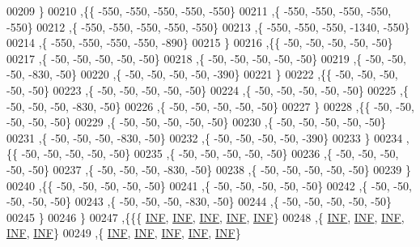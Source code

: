 \begin{DoxyCode}
00209   \}
00210  ,\{\{  -550,  -550,  -550,  -550,  -550\}
00211   ,\{  -550,  -550,  -550,  -550,  -550\}
00212   ,\{  -550,  -550,  -550,  -550,  -550\}
00213   ,\{  -550,  -550,  -550, -1340,  -550\}
00214   ,\{  -550,  -550,  -550,  -550,  -890\}
00215   \}
00216  ,\{\{   -50,   -50,   -50,   -50,   -50\}
00217   ,\{   -50,   -50,   -50,   -50,   -50\}
00218   ,\{   -50,   -50,   -50,   -50,   -50\}
00219   ,\{   -50,   -50,   -50,  -830,   -50\}
00220   ,\{   -50,   -50,   -50,   -50,  -390\}
00221   \}
00222  ,\{\{   -50,   -50,   -50,   -50,   -50\}
00223   ,\{   -50,   -50,   -50,   -50,   -50\}
00224   ,\{   -50,   -50,   -50,   -50,   -50\}
00225   ,\{   -50,   -50,   -50,  -830,   -50\}
00226   ,\{   -50,   -50,   -50,   -50,   -50\}
00227   \}
00228  ,\{\{   -50,   -50,   -50,   -50,   -50\}
00229   ,\{   -50,   -50,   -50,   -50,   -50\}
00230   ,\{   -50,   -50,   -50,   -50,   -50\}
00231   ,\{   -50,   -50,   -50,  -830,   -50\}
00232   ,\{   -50,   -50,   -50,   -50,  -390\}
00233   \}
00234  ,\{\{   -50,   -50,   -50,   -50,   -50\}
00235   ,\{   -50,   -50,   -50,   -50,   -50\}
00236   ,\{   -50,   -50,   -50,   -50,   -50\}
00237   ,\{   -50,   -50,   -50,  -830,   -50\}
00238   ,\{   -50,   -50,   -50,   -50,   -50\}
00239   \}
00240  ,\{\{   -50,   -50,   -50,   -50,   -50\}
00241   ,\{   -50,   -50,   -50,   -50,   -50\}
00242   ,\{   -50,   -50,   -50,   -50,   -50\}
00243   ,\{   -50,   -50,   -50,  -830,   -50\}
00244   ,\{   -50,   -50,   -50,   -50,   -50\}
00245   \}
00246  \}
00247 ,\{\{\{   \mbox{\hyperlink{energy__const_8h_a12c2040f25d8e3a7b9e1c2024c618cb6}{INF}},   \mbox{\hyperlink{energy__const_8h_a12c2040f25d8e3a7b9e1c2024c618cb6}{INF}},   \mbox{\hyperlink{energy__const_8h_a12c2040f25d8e3a7b9e1c2024c618cb6}{INF}},   \mbox{\hyperlink{energy__const_8h_a12c2040f25d8e3a7b9e1c2024c618cb6}{INF}},   \mbox{\hyperlink{energy__const_8h_a12c2040f25d8e3a7b9e1c2024c618cb6}{INF}}\}
00248   ,\{   \mbox{\hyperlink{energy__const_8h_a12c2040f25d8e3a7b9e1c2024c618cb6}{INF}},   \mbox{\hyperlink{energy__const_8h_a12c2040f25d8e3a7b9e1c2024c618cb6}{INF}},   \mbox{\hyperlink{energy__const_8h_a12c2040f25d8e3a7b9e1c2024c618cb6}{INF}},   \mbox{\hyperlink{energy__const_8h_a12c2040f25d8e3a7b9e1c2024c618cb6}{INF}},   \mbox{\hyperlink{energy__const_8h_a12c2040f25d8e3a7b9e1c2024c618cb6}{INF}}\}
00249   ,\{   \mbox{\hyperlink{energy__const_8h_a12c2040f25d8e3a7b9e1c2024c618cb6}{INF}},   \mbox{\hyperlink{energy__const_8h_a12c2040f25d8e3a7b9e1c2024c618cb6}{INF}},   \mbox{\hyperlink{energy__const_8h_a12c2040f25d8e3a7b9e1c2024c618cb6}{INF}},   \mbox{\hyperlink{energy__const_8h_a12c2040f25d8e3a7b9e1c2024c618cb6}{INF}},   \mbox{\hyperlink{energy__const_8h_a12c2040f25d8e3a7b9e1c2024c618cb6}{INF}}\}

\end{DoxyCode}
